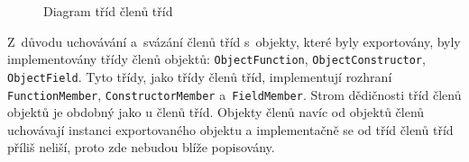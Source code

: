 \begin{figure}[H]
  \begin{center}
    \caption{Diagram tříd členů tříd}
    \label{Figure.ClassMember}
  \end{center}
\end{figure}

\vspace{-1em}

Z~důvodu uchovávání a~svázání členů tříd s~objekty, které byly exportovány, byly implementovány třídy členů objektů: \texttt{ObjectFunction}, \texttt{ObjectConstructor}, \texttt{ObjectField}. Tyto třídy, jako třídy členů tříd, implementují rozhraní \texttt{FunctionMember}, \texttt{ConstructorMember} a~\texttt{FieldMember}. Strom dědičnosti tříd členů objektů je obdobný jako u členů tříd. Objekty členů navíc od objektů členů uchovávají instanci exportovaného objektu a implementačně se od tříd členů tříd příliš neliší, proto zde nebudou blíže popisovány.

